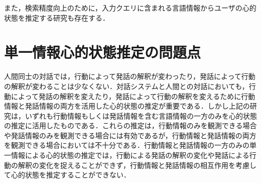 \par
また，検索精度向上のために，入力クエリに含まれる言語情報からユーザの心的状態を推定する研究\cite{10.1007/978-3-642-02481-8_4}も存在する．

\section{単一情報心的状態推定の問題点}
\par
人間同士の対話では，行動によって発話の解釈が変わったり，発話によって行動の解釈が変わることは少なくない．対話システムと人間との対話においても，行動によって発話の解釈を変えたり，発話によって行動の解釈を変えるために行動情報と発話情報の両方を活用した心的状態の推定が重要である．しかし上記の研究は，いずれも行動情報もしくは発話情報を含む言語情報の一方のみを心的状態の推定に活用したものである．これらの推定は，行動情報のみを観測できる場合や発話情報のみを観測できる場合には有効であるが，行動情報と発話情報の両方を観測できる場合においては不十分である．行動情報と発話情報の一方のみの単一情報による心的状態の推定では，行動による発話の解釈の変化や発話による行動の解釈の変化を捉えることができず，行動情報と発話情報の相互作用を考慮して心的状態を推定することができない．
